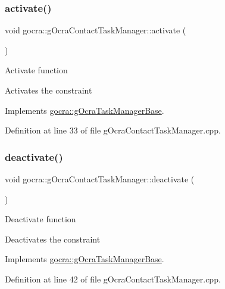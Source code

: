 \subsubsection{\texorpdfstring{activate()}{activate()}}
{\footnotesize\ttfamily void gocra\+::g\+Ocra\+Contact\+Task\+Manager\+::activate (\begin{DoxyParamCaption}{ }\end{DoxyParamCaption})\hspace{0.3cm}{\ttfamily [virtual]}}

Activate function

Activates the constraint 

Implements \hyperlink{classgocra_1_1gOcraTaskManagerBase_a50cf1c408749d6e9dcfaf50bcab77dee}{gocra\+::g\+Ocra\+Task\+Manager\+Base}.



Definition at line 33 of file g\+Ocra\+Contact\+Task\+Manager.\+cpp.

\hypertarget{classgocra_1_1gOcraContactTaskManager_adf02de85b4a661c70cd7e2031c1b7500}{}\label{classgocra_1_1gOcraContactTaskManager_adf02de85b4a661c70cd7e2031c1b7500} 
\subsubsection{\texorpdfstring{deactivate()}{deactivate()}}
{\footnotesize\ttfamily void gocra\+::g\+Ocra\+Contact\+Task\+Manager\+::deactivate (\begin{DoxyParamCaption}{ }\end{DoxyParamCaption})\hspace{0.3cm}{\ttfamily [virtual]}}

Deactivate function

Deactivates the constraint 

Implements \hyperlink{classgocra_1_1gOcraTaskManagerBase_a7cf9111e69aee47a39fe0f2976a20d6c}{gocra\+::g\+Ocra\+Task\+Manager\+Base}.



Definition at line 42 of file g\+Ocra\+Contact\+Task\+Manager.\+cpp.

\hypertarget{classgocra_1_1gOcraContactTaskManager_a50ef70ceb95ced6818a5990fa6615d6a}{}\label{classgocra_1_1gOcraContactTaskManager_a50ef70ceb95ced6818a5990fa6615d6a} 
